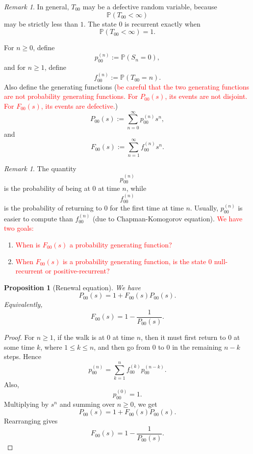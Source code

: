 \documentclass[11pt]{article}
\theoremstyle{plain}
\newtheorem{proposition}[theorem]{Proposition}
\theoremstyle{definition}
\theoremstyle{remark}
\newtheorem{remark}[theorem]{Remark}
\begin{document}
	\begin{remark}
		In general, \(T_{00}\) may be a defective random variable, because
		\[
		\mathbb{P}(T_{00}<\infty)
		\]
		may be strictly less than \(1\). The state \(0\) is recurrent exactly when
		\[
		\mathbb{P}(T_{00}<\infty)=1.
		\]
	\end{remark}
	
	For \(n\ge0\), define
	\[
	p_{00}^{(n)}:=\mathbb{P}(S_n=0),
	\]
	and for \(n\ge 1\), define
	\[
	f_{00}^{(n)}:=\mathbb{P}(T_{00}=n).
	\]
	Also define the generating functions
    (\textcolor{red}{be careful that the two generating functions are not probability generating functions. For $P_{00}(s)$, its events are not disjoint. For $F_{00}(s)$, its events are defective.})
	\[
	P_{00}(s)
	:=
	\sum_{n=0}^{\infty}p_{00}^{(n)}s^n,
	\]
	and
	\[
	F_{00}(s)
	:=
	\sum_{n=1}^{\infty}f_{00}^{(n)}s^n.
	\]
	
	\begin{remark}
		The quantity
		\[
		p_{00}^{(n)}
		\]
		is the probability of being at \(0\) at time \(n\), while
		\[
		f_{00}^{(n)}
		\]
		is the probability of returning to \(0\) for the first time at time \(n\). Usually, \(p_{00}^{(n)}\) is easier to compute than \(f_{00}^{(n)}\) (due to Chapman-Komogorov equation).
        \textcolor{red}{We have two goals:}
        \begin{enumerate}
            \item [(1)]
            \textcolor{red}{When is $F_{00}(s)$ a probability generating function?}
            \item [(2)]
            \textcolor{red}{When $F_{00}(s)$ is a probability generating function, is the state $0$ null-recurrent or positive-recurrent?}
        \end{enumerate}
	\end{remark}
	
	\begin{proposition}[Renewal equation]
		We have
		\[
		P_{00}(s)
		=
		1+F_{00}(s)P_{00}(s).
		\]
		Equivalently,
		\[
		F_{00}(s)
		=
		1-\frac{1}{P_{00}(s)}.
		\]
	\end{proposition}
	
	\begin{proof}
		For \(n\ge 1\), if the walk is at \(0\) at time \(n\), then it must first return to \(0\) at some time \(k\), where \(1\le k\le n\), and then go from \(0\) to \(0\) in the remaining \(n-k\) steps. Hence
		\[
		p_{00}^{(n)}
		=
		\sum_{k=1}^{n}f_{00}^{(k)}p_{00}^{(n-k)}.
		\]
		Also,
		\[
		p_{00}^{(0)}=1.
		\]
		Multiplying by \(s^n\) and summing over \(n\ge 0\), we get
		\[
		P_{00}(s)
		=
		1+F_{00}(s)P_{00}(s).
		\]
		Rearranging gives
		\[
		F_{00}(s)
		=
		1-\frac{1}{P_{00}(s)}.
		\]
	\end{proof}
	
\end{document}
